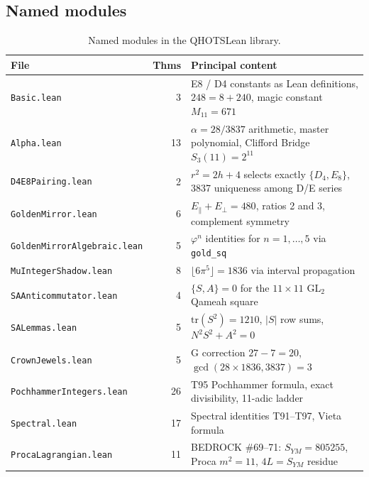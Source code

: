 \documentclass[11pt,a4paper]{article}
\begin{document}
\subsection{Named modules}
\label{sec:named}

\begin{table}[ht]
\centering
\caption{Named modules in the QHOTSLean library.}
\label{tab:named}
\begin{tabular}{lrp{8cm}}
\toprule
File & Thms & Principal content \\
\midrule
\texttt{Basic.lean}              &  3 & E8 / D4 constants as Lean definitions,
                                        $248 = 8 + 240$, magic constant $M_{11}=671$ \\
\texttt{Alpha.lean}              & 13 & $\alpha = 28/3837$ arithmetic, master polynomial,
                                        Clifford Bridge $S_3(11)=2^{11}$ \\
\texttt{D4E8Pairing.lean}        &  2 & $r^2=2h+4$ selects exactly $\{D_4,E_8\}$,
                                        3837 uniqueness among D/E series \\
\texttt{GoldenMirror.lean}       &  6 & $E_\parallel+E_\perp=480$, ratios 2 and 3,
                                        complement symmetry \\
\texttt{GoldenMirrorAlgebraic.lean} & 5 & $\varphi^n$ identities for $n=1,\ldots,5$
                                          via \texttt{gold\_sq} \\
\texttt{MuIntegerShadow.lean}    &  8 & $\lfloor 6\pi^5\rfloor = 1836$ via interval
                                         propagation \\
\texttt{SAAnticommutator.lean}   &  4 & $\{S,A\}=0$ for the $11\times 11$ GL$_2$
                                        Qameah square \\
\texttt{SALemmas.lean}           &  5 & $\mathrm{tr}(S^2)=1210$, $|S|$ row sums,
                                        $N^2S^2+A^2=0$ \\
\texttt{CrownJewels.lean}        &  5 & G correction $27-7=20$, $\gcd(28\times 1836,3837)=3$ \\
\texttt{PochhammerIntegers.lean} & 26 & T95 Pochhammer formula, exact divisibility,
                                        11-adic ladder \\
\texttt{Spectral.lean}           & 17 & Spectral identities T91--T97, Vieta formula \\
\texttt{ProcaLagrangian.lean}    & 11 & BEDROCK \#69--71: $S_{YM}=805255$,
                                        Proca $m^2=11$, $4L=S_{YM}$ residue \\

\end{tabular}
\end{table}
\end{document}
